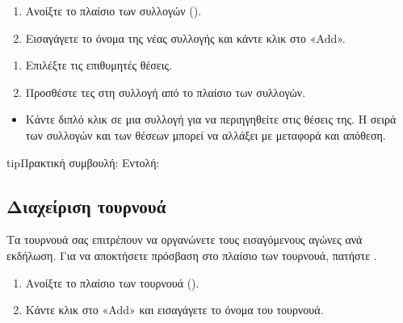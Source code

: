 \documentclass[letterpaper,10pt,greek]{sphinxmanual}
\begin{document}
\sphinxAtStartPar
{}
\begin{enumerate}
%
\item {} 
\sphinxAtStartPar
Ανοίξτε το πλαίσιο των συλλογών ().

\item {} 
\sphinxAtStartPar
Εισαγάγετε το όνομα της νέας συλλογής και κάντε κλικ στο «Add».

\end{enumerate}

\sphinxAtStartPar
{}
\begin{enumerate}
%
\item {} 
\sphinxAtStartPar
Επιλέξτε τις επιθυμητές θέσεις.

\item {} 
\sphinxAtStartPar
Προσθέστε τες στη συλλογή από το πλαίσιο των συλλογών.

\end{enumerate}

\sphinxAtStartPar
{}
\begin{itemize}
\item {} 
\sphinxAtStartPar
Κάντε διπλό κλικ σε μια συλλογή για να περιηγηθείτε στις θέσεις της. Η σειρά των συλλογών και των θέσεων μπορεί να αλλάξει με μεταφορά και απόθεση.

\end{itemize}

\begin{sphinxadmonition}{tip}{Πρακτική συμβουλή:}
\sphinxAtStartPar
Εντολή: 
\end{sphinxadmonition}


\subsection{Διαχείριση τουρνουά}
\label{\detokenize{guide_utilisateur:gerer-les-tournois}}
\sphinxAtStartPar
Τα τουρνουά σας επιτρέπουν να οργανώνετε τους εισαγόμενους αγώνες ανά εκδήλωση. Για να αποκτήσετε πρόσβαση στο πλαίσιο των τουρνουά, πατήστε .

\sphinxAtStartPar
{}
\begin{enumerate}
%
\item {} 
\sphinxAtStartPar
Ανοίξτε το πλαίσιο των τουρνουά ().

\item {} 
\sphinxAtStartPar
Κάντε κλικ στο «Add» και εισαγάγετε το όνομα του τουρνουά.

\end{enumerate}
\end{document}
